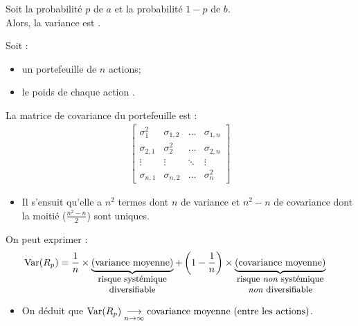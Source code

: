 \documentclass[10pt, french]{article}
\begin{document}
\begin{multicols*}{2}
\begin{rappel_enhanced}
Soit la probabilité $p$ de $a$ et la probabilité $1 - p$ de $b$.\\
Alors, la variance est .
\end{rappel_enhanced}

Soit :
\begin{itemize}
	\item	un portefeuille de $n$ actions;
	\item	le poids de chaque action .
\end{itemize}

La matrice de covariance du portefeuille est : 
\begin{align*}
	\begin{bmatrix}
	\sigma_{1}^{2}	&	\sigma_{1, 2}	&	\hdots	&	\sigma_{1, n}	\\
	\sigma_{2, 1}	&	\sigma_{2}^{2}	&	\hdots	&	\sigma_{2, n}	\\
	\vdots	&	\vdots	&	\ddots	&	\vdots	\\
	\sigma_{n, 1}	&	\sigma_{n, 2}	&	\hdots	&	\sigma_{n}^{2}
	\end{bmatrix}
\end{align*}
\begin{itemize}
	\item	Il s'ensuit qu'elle a $n^{2}$ termes dont $n$ de variance et $n^{2}	-	n$ de covariance dont la moitié ($\frac{n^{2} - n}{2}$) sont uniques.
\end{itemize}

On peut exprimer :
	\setlength{\mathindent}{-1cm}
	\begin{align*}
	\text{Var}(R_{p})	
	&=	\frac{1}{n} \times \underbrace{\left(\text{variance moyenne}\right)}_{\small{\shortstack{risque systémique\\ diversifiable}}} + \left(1 - \frac{1}{n}\right)  \times  \underbrace{\left(\text{covariance moyenne}\right)}_{\small{\shortstack{risque \textit{non} systémique\\ \textit{non} diversifiable}}}
	\end{align*}
	\setlength{\mathindent}{1cm}

\begin{itemize}
	\item	On déduit que $\text{Var}(R_{p}) \underset{n\rightarrow \infty}{\longrightarrow} \shortstack{covariance moyenne (entre les actions)}$.
\end{itemize}



\end{multicols*}
\end{document}
